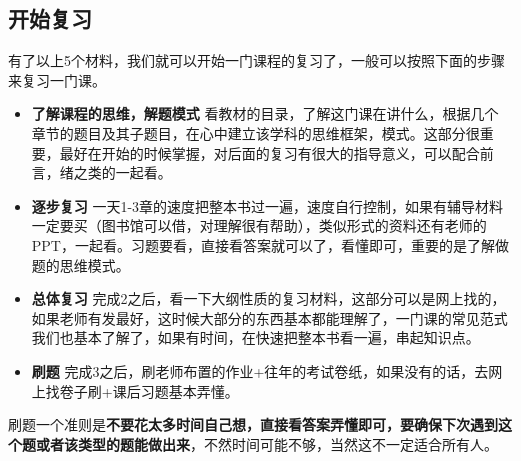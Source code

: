 \documentclass[a4paper]{article}
\begin{document}
\subsection{开始复习} \label{sub:start}
有了以上5个材料，我们就可以开始一门课程的复习了，一般可以按照下面的步骤来复习一门课。
\begin{itemize}
	\item{\textbf{了解课程的思维，解题模式} 看教材的目录，了解这门课在讲什么，根据几个章节的题目及其子题目，在心中建立该学科的思维框架，模式。这部分很重要，最好在开始的时候掌握，对后面的复习有很大的指导意义，可以配合前言，绪之类的一起看。}
    \item{\textbf{逐步复习} 一天1-3章的速度把整本书过一遍，速度自行控制，如果有辅导材料一定要买（图书馆可以借，对理解很有帮助），类似形式的资料还有老师的PPT，一起看。习题要看，直接看答案就可以了，看懂即可，重要的是了解做题的思维模式。}
    \item{\textbf{总体复习} 完成2之后，看一下大纲性质的复习材料，这部分可以是网上找的，如果老师有发最好，这时候大部分的东西基本都能理解了，一门课的常见范式我们也基本了解了，如果有时间，在快速把整本书看一遍，串起知识点。}
    \item{\textbf{刷题} 完成3之后，刷老师布置的作业+往年的考试卷纸，如果没有的话，去网上找卷子刷+课后习题基本弄懂。}
\end{itemize}

刷题一个准则是\textbf{不要花太多时间自己想，直接看答案弄懂即可，要确保下次遇到这个题或者该类型的题能做出来}，不然时间可能不够，当然这不一定适合所有人。

\newpage




\end{document}
